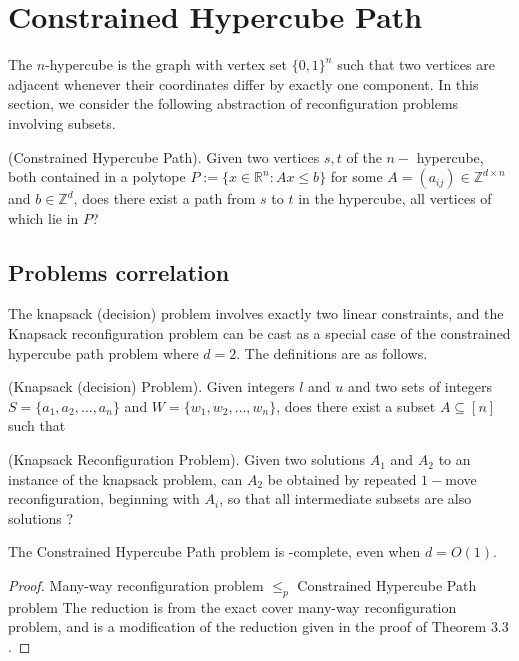 \chapter{Constrained Hypercube Path}
\label{chap:hypercube}

The $n$-hypercube is the graph with vertex set $\{0, 1\}^n$ such that two vertices are adjacent whenever their coordinates differ by
exactly one component. In this section, we consider the following abstraction of reconfiguration problems involving subsets.

\begin{defn}{(Constrained Hypercube Path).} Given two vertices $s, t$ of the $n-$ hypercube, both contained in a polytope
$P := \{x \in \mathbb{R}^n : Ax \leq b\}$ for some $A = (a_{ij}) \in \mathbb{Z}^{d \times n}$ and $b \in \mathbb{Z}^d$, does there exist a path from $s$ to $t$
in the hypercube, all vertices of which lie in $P$?
\end{defn}

\section{Problems correlation}
The knapsack (decision) problem involves exactly two linear constraints, and the Knapsack reconfiguration problem can be cast as a special case of the
constrained hypercube path problem where $d = 2$. The definitions are as follows.

\begin{defn}{(Knapsack (decision) Problem).} Given integers $l$ and $u$ and two sets of integers $S = \{a_1, a_2,\dots, a_n\}$ and $W = \{w_1, w_2,\dots, w_n\}$,
does there exist a subset $A \subseteq [ n ]$ such that
\end{defn}

\begin{defn}{(Knapsack Reconfiguration Problem).} Given two solutions $A_1$ and $A_2$ to an instance of the knapsack problem, can $A_2$ be obtained
by repeated $1-$move reconfiguration, beginning with $A_i$, so that all intermediate subsets are also solutions ?
\end{defn}

\begin{theorem}{}The Constrained Hypercube Path problem is \PSPACE-complete, even when $d = O(1)$.
\end{theorem}

\begin{proof}{Many-way reconfiguration problem $\leq_p$ Constrained Hypercube Path problem}
The reduction is from the exact cover many-way reconfiguration problem, and is a modification of the
reduction given in the proof of Theorem $3.3$.  
\end{proof}


